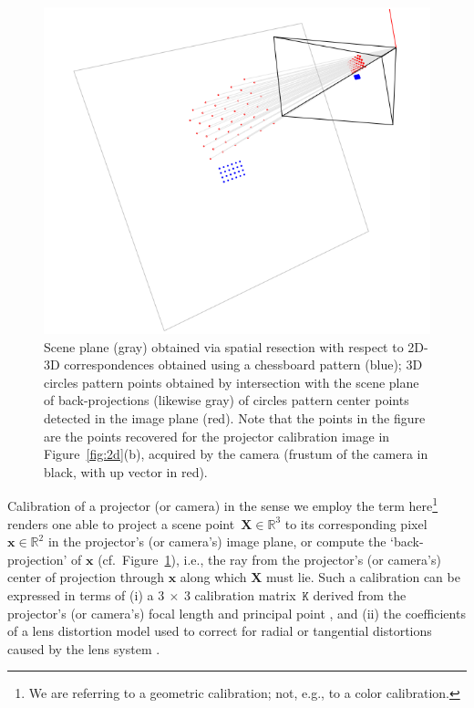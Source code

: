 \documentclass[review]{elsarticle}
\begin{document}
\begin{figure}
    \centerline{\includegraphics[scale=.35]{images/2d3d.png}}
    \caption{Scene plane (gray) obtained via spatial resection with respect to 2D-3D correspondences obtained using a chessboard pattern (blue); 3D circles pattern points obtained by intersection with the scene plane of back-projections (likewise gray) of circles pattern center points detected in the image plane (red). Note that the points in the figure are the points recovered for the projector calibration image in Figure~\ref{fig:2d}(b), acquired by the camera (frustum of the camera in black, with up vector in red).}
    \label{fig:3d}
\end{figure}


Calibration of a projector (or camera) in the sense we employ the term here\footnote{We are referring to a geometric calibration; not, e.g., to a color calibration.} renders one able to project a scene point~$\mathbf{X} \in \mathbb{R}^3$ to its corresponding pixel~$\mathbf{x} \in \mathbb{R}^2$ in the projector's (or camera's) image plane, or compute the `back-projection' of $\mathbf{x}$ (cf.\ Figure~\ref{fig:3d}), i.e., the ray from the projector's (or camera's) center of projection through $\mathbf{x}$ along which $\mathbf{X}$ must lie. Such a calibration can be expressed in terms of (i) a $3~\times{}~3$ calibration matrix~$\mathtt{K}$ derived from the projector's (or camera's) focal length and principal point \cite{Hartley2004}, and (ii) the coefficients of a lens distortion model used to correct for radial or tangential distortions caused by the lens system \cite{duane1971close}.
\end{document}
